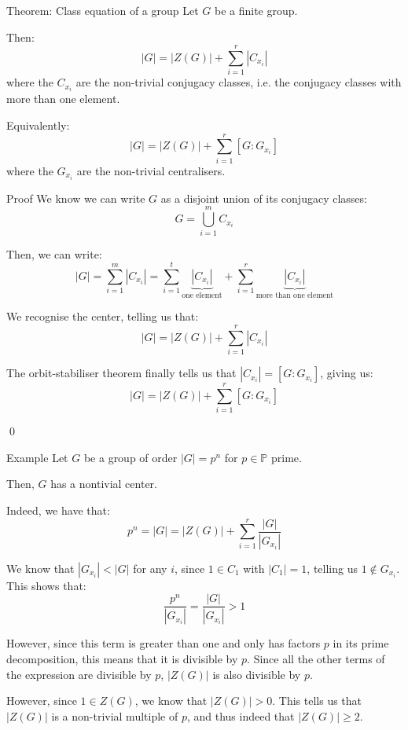 \documentclass[a4paper]{article}
\begin{document}
\begin{parag}{Theorem: Class equation of a group}
    Let $G$ be a finite group.

    Then: 
    \[\left|G\right| = \left|Z\left(G\right)\right| + \sum_{i=1}^{r} \left|C_{x_i}\right|\]
    where the $C_{x_i}$ are the non-trivial conjugacy classes, i.e. the conjugacy classes with more than one element.

    Equivalently:
    \[\left|G\right| = \left|Z\left(G\right)\right| + \sum_{i=1}^{r} \left[G : G_{x_i}\right]\]
    where the $G_{x_i}$ are the non-trivial centralisers.

    \begin{subparag}{Proof}
        We know we can write $G$ as a disjoint union of its conjugacy classes: 
        \[G = \bigcup_{i=1}^{m} C_{x_i}\]
        
        Then, we can write: 
        \[\left|G\right| = \sum_{i=1}^{m}\left|C_{x_i}\right| = \sum_{i=1}^{t} \underbrace{\left|C_{x_i}\right|}_{\text{one element}}  + \sum_{i=1}^{r} \underbrace{\left|C_{x_i}\right|}_{\text{more than one element}}\]

        We recognise the center, telling us that: 
        \[\left|G\right| = \left|Z\left(G\right)\right| + \sum_{i=1}^{r} \left|C_{x_i}\right|\]

        The orbit-stabiliser theorem finally tells us that $\left|C_{x_i}\right| = \left[G : G_{x_i}\right]$, giving us: 
        \[\left|G\right| = \left|Z\left(G\right)\right| + \sum_{i=1}^{r} \left[G : G_{x_i}\right]\]

        \qed
    \end{subparag}
\end{parag}

\begin{parag}{Example}
    Let $G$ be a group of order $\left|G\right| = p^n$ for $p \in \mathbb{P}$ prime.

    Then, $G$ has a nontivial center.

    Indeed, we have that: 
    \[p^n = \left|G\right| = \left|Z\left(G\right)\right| + \sum_{i=1}^{r} \frac{\left|G\right|}{\left|G_{x_i}\right|}\]
    
    We know that $\left|G_{x_i}\right| < \left|G\right|$ for any $i$, since $1 \in C_1$ with $\left|C_1\right| = 1$, telling us $1 \not \in G_{x_i}$. This shows that: 
    \[\frac{p^n}{\left|G_{x_i}\right|} = \frac{\left|G\right|}{\left|G_{x_i}\right|} > 1\]
    
    However, since this term is greater than one and only has factors $p$ in its prime decomposition, this means that it is divisible by $p$. Since all the other terms of the expression are divisible by $p$, $\left|Z\left(G\right)\right|$ is also divisible by $p$.

    However, since $1 \in Z\left(G\right)$, we know that $\left|Z\left(G\right)\right| > 0$. This tells us that $\left|Z\left(G\right)\right|$ is a non-trivial multiple of $p$, and thus indeed that $\left|Z\left(G\right)\right| \geq 2$.
\end{parag}
\end{document}
